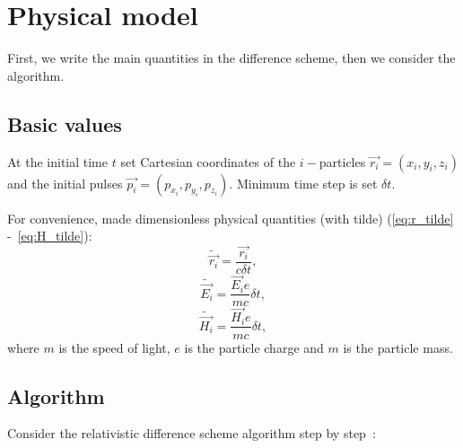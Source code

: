 \section{Physical model}\label{sec:physical-model}

First, we write the main quantities in the difference scheme, then we consider the algorithm.

\subsection{Basic values}\label{subsec:basic-values}
At the initial time $t$ set Cartesian coordinates of the $i-$particles $\overrightarrow{r_{i}} = (x_i, y_i, z_i)$ and the initial pulses $\overrightarrow{p_{i}} = (p_{x_i}, p_{y_i}, p_{z_i})$.
Minimum time step is set $\delta t$.

For convenience, made dimensionless physical quantities (with tilde) (\ref{eq:r_tilde} -~\ref{eq:H_tilde}):
\begin{equation}
    \label{eq:r_tilde}
    \widetilde{\overrightarrow{r_i}} = \frac{\overrightarrow{r_i}}{c \delta t},
\end{equation}
\begin{equation}
\label{eq:E_tilde}
    \widetilde{\overrightarrow{E_i}} = \frac{\overrightarrow{E_i}e}{mc} \delta t,
\end{equation}
\begin{equation}
\label{eq:H_tilde}
    \widetilde{\overrightarrow{H_i}} = \frac{\overrightarrow{H_i}e}{mc} \delta t,
\end{equation}
where $m$ is the speed of light, $e$ is the particle charge and $m$ is the particle mass.

\subsection{Algorithm}\label{subsec:algorithm}

Consider the relativistic difference scheme algorithm step by step~\cite{Logatchev2011}:

